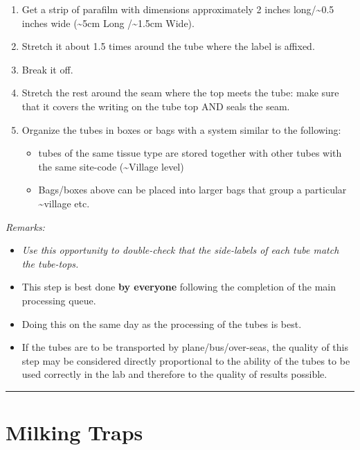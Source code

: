 \documentclass[letterpaper]{scrreprt}
\begin{document}
\begin{enumerate}
\def\labelenumi{\arabic{enumi}.}
\itemsep1pt\parskip0pt
\item
  Get a strip of parafilm with dimensions approximately 2 inches
  long/\textasciitilde{}0.5 inches wide (\textasciitilde{}5cm Long
  /\textasciitilde{}1.5cm Wide).
\item
  Stretch it about 1.5 times around the tube where the label is affixed.
\item
  Break it off.
\item
  Stretch the rest around the seam where the top meets the tube: make
  sure that it covers the writing on the tube top AND seals the seam.
\item
  Organize the tubes in boxes or bags with a system similar to the
  following:

  \begin{itemize}
  \itemsep1pt\parskip0pt
  \item
    tubes of the same tissue type are stored together with other tubes
    with the same site-code (\textasciitilde{}Village level)
  \item
    Bags/boxes above can be placed into larger bags that group a
    particular \textasciitilde{}village etc.
  \end{itemize}
\end{enumerate}

\emph{Remarks:}

\begin{itemize}
\itemsep1pt\parskip0pt
\item
  \emph{Use this opportunity to double-check that the side-labels of
  each tube match the tube-tops.}
\item
  This step is best done \textbf{by everyone} following the completion
  of the main processing queue.
\item
  Doing this on the same day as the processing of the tubes is best.
\item
  If the tubes are to be transported by plane/bus/over-seas, the quality
  of this step may be considered directly proportional to the ability of
  the tubes to be used correctly in the lab and therefore to the quality
  of results possible.
\end{itemize}

\begin{center}\rule{0.5\linewidth}{\linethickness}\end{center}

\chapter{Milking Traps}\label{milking-traps}
\end{document}
